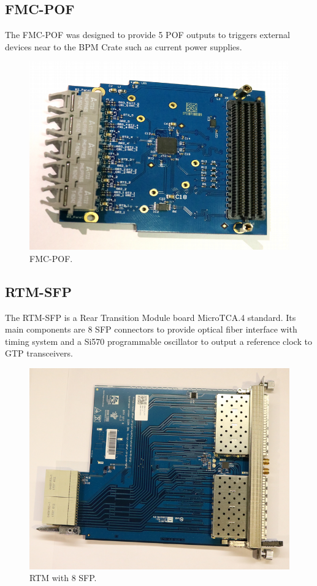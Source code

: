 \documentclass[a4paper,
               biblatex,      %
               ]{jacow}
\begin{document}
\subsection{FMC-POF}
The FMC-POF \cite{fmc-pof-git} was designed to provide 5 POF outputs to triggers external devices near to the BPM Crate such as current power supplies.

\begin{figure}[!htb]
   \centering
   \includegraphics*[width=0.5\columnwidth]{FMC_POF_resized}
   \caption{FMC-POF.}
   \label{fig:fmc_pof}
\end{figure}

\subsection{RTM-SFP}
The RTM-SFP \cite{rtm-sfp-git} is a Rear Transition Module board MicroTCA.4 standard. Its main components are 8 SFP connectors to provide optical fiber interface with timing system and a Si570 programmable oscillator to output a reference clock to GTP transceivers. 

\begin{figure}[!htb]
   \centering
   \includegraphics*[width=0.8\columnwidth]{RTM_SFP_resized}
   \caption{RTM with 8 SFP.}
   \label{fig:rtm_sfp}
\end{figure}
\end{document}
